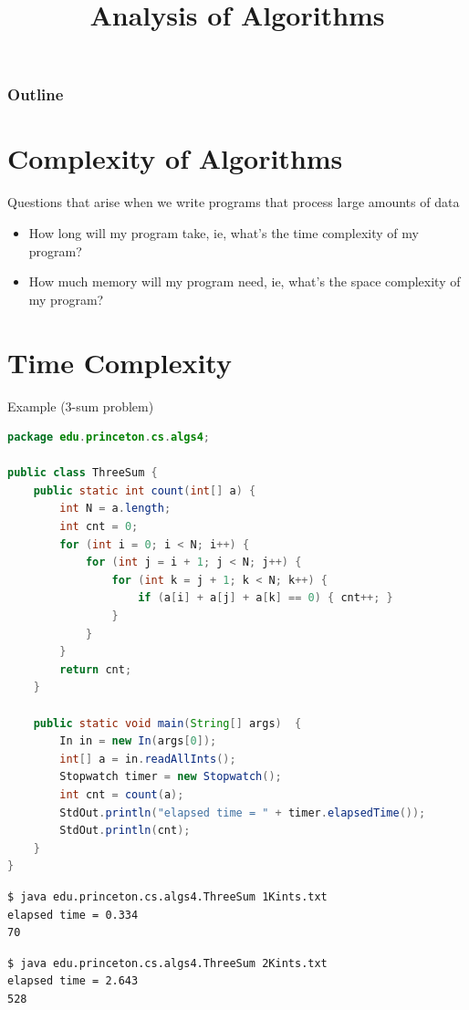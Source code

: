 \documentclass[8pt,a4paper,compress]{beamer}
\title{Analysis of Algorithms}
\date{}
\begin{document}
\begin{frame}
\vfill
\titlepage
\end{frame}

\begin{frame}
\frametitle{Outline}
\tableofcontents
\end{frame}

\section{Complexity of Algorithms}
\begin{frame}[fragile]
\pause

Questions that arise when we write programs that process large amounts of data
\begin{itemize}
\item How long will my program take, ie, what's the time complexity of my program?
\item How much memory will my program need, ie, what's the space complexity of my program?
\end{itemize}
\end{frame}

\section{Time Complexity}
\begin{frame}[fragile]
\pause

Example (3-sum problem)
\begin{lstlisting}[language=Java]
package edu.princeton.cs.algs4;

public class ThreeSum {
    public static int count(int[] a) {
        int N = a.length;
        int cnt = 0;
        for (int i = 0; i < N; i++) {
            for (int j = i + 1; j < N; j++) {
                for (int k = j + 1; k < N; k++) {
                    if (a[i] + a[j] + a[k] == 0) { cnt++; }
                }
            }
        }
        return cnt;
    }
    
    public static void main(String[] args)  { 
        In in = new In(args[0]);
        int[] a = in.readAllInts();
        Stopwatch timer = new Stopwatch();
        int cnt = count(a);
        StdOut.println("elapsed time = " + timer.elapsedTime());
        StdOut.println(cnt);
    } 
}
\end{lstlisting}

\pause

\begin{lstlisting}[language={}]
$ java edu.princeton.cs.algs4.ThreeSum 1Kints.txt 
elapsed time = 0.334
70
\end{lstlisting}

\pause

\begin{lstlisting}[language={}]
$ java edu.princeton.cs.algs4.ThreeSum 2Kints.txt 
elapsed time = 2.643
528
\end{lstlisting}
\end{frame}
\end{document}
